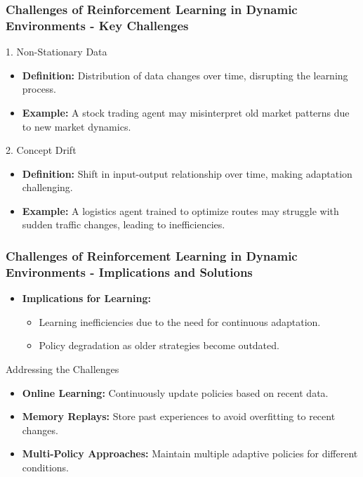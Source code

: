 \documentclass[aspectratio=169]{beamer}
\begin{document}
\begin{frame}[fragile]
    \frametitle{Challenges of Reinforcement Learning in Dynamic Environments - Key Challenges}
    \begin{block}{1. Non-Stationary Data}
        \begin{itemize}
            \item \textbf{Definition:} Distribution of data changes over time, disrupting the learning process.
            \item \textbf{Example:} A stock trading agent may misinterpret old market patterns due to new market dynamics.
        \end{itemize}
    \end{block}
    
    \begin{block}{2. Concept Drift}
        \begin{itemize}
            \item \textbf{Definition:} Shift in input-output relationship over time, making adaptation challenging.
            \item \textbf{Example:} A logistics agent trained to optimize routes may struggle with sudden traffic changes, leading to inefficiencies.
        \end{itemize}
    \end{block}
\end{frame}

\begin{frame}[fragile]
    \frametitle{Challenges of Reinforcement Learning in Dynamic Environments - Implications and Solutions}
    \begin{itemize}
        \item \textbf{Implications for Learning:}
        \begin{itemize}
            \item Learning inefficiencies due to the need for continuous adaptation.
            \item Policy degradation as older strategies become outdated.
        \end{itemize}
    \end{itemize}
    
    \begin{block}{Addressing the Challenges}
        \begin{itemize}
            \item \textbf{Online Learning:} Continuously update policies based on recent data.
            \item \textbf{Memory Replays:} Store past experiences to avoid overfitting to recent changes.
            \item \textbf{Multi-Policy Approaches:} Maintain multiple adaptive policies for different conditions.
        \end{itemize}
    \end{block}
\end{frame}
\end{document}
